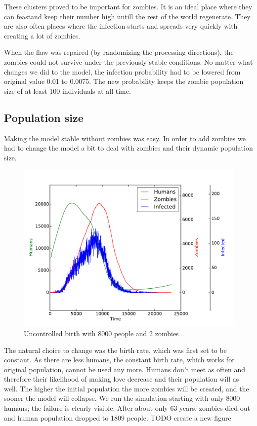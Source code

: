 \documentclass[a4paper]{article}
\begin{document}
These clusters proved to be important for zombies.
It is an ideal place where they can feastand keep their number high untill the rest of the world regenerate.
They are also often places where the infection starts and spreads very quickly with creating a lot of zombies.

When the flaw was repaired (by randomizing the processing directions), the zombies could not survive under the previously stable conditions.
No matter what changes we did to the model, the infection probability had to be lowered from original value 0.01 to 0.0075.
The new probability keeps the zombie population size of at least 100 individuals at all time.

\subsection{Population size}

Making the model stable without zombies was easy.
In order to add zombies we had to change the model a bit to deal with zombies and their dynamic population size.

\begin{figure}[pht]
    \centering
    \includegraphics[width=\textwidth]{uncontrolled_birth_8000}
    \caption{Uncontrolled birth with 8000 people and 2 zombies}
\end{figure}

The natural choice to change was the birth rate, which was first set to be constant.
As there are less humans, the constant birth rate, which works for original population, cannot be used any more.
Humans don't meet as often and therefore their likelihood of making love decrease and their population will as well.
The higher the initial population the more zombies will be created, and the sooner the model will collapse.
We run the simulation starting with only 8000 humans; the failure is clearly visible.
After about only 63 years, zombies died out and human population dropped to 1809 people.
TODO create a new figure
\end{document}
